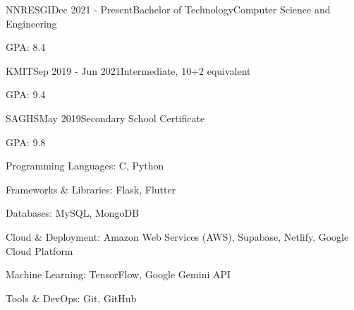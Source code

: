 \documentclass{professional_resume}
\begin{document}


\begin{rSubsection}{NNRESGI}{Dec 2021 - Present}{Bachelor of Technology}{Computer Science and Engineering}
\item GPA: 8.4
\end{rSubsection}
\begin{rSubsection}{KMIT}{Sep 2019 - Jun 2021}{Intermediate, 10+2 equivalent}{}
\item GPA: 9.4
\end{rSubsection}
\begin{rSubsection}{SAGHS}{May 2019}{Secondary School Certificate}{}
\item GPA: 9.8
\end{rSubsection}

\begin{rSkills}
\item Programming Languages: C, Python
\item Frameworks \& Libraries: Flask, Flutter
\item Databases: MySQL, MongoDB
\item Cloud \& Deployment: Amazon Web Services (AWS), Supabase, Netlify, Google Cloud Platform
\item Machine Learning: TensorFlow, Google Gemini API
\item Tools \& DevOps: Git, GitHub
\end{rSkills}
\end{document}
